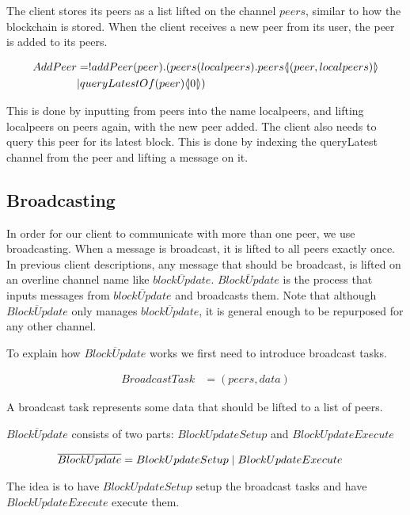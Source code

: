 The client stores its peers as a list lifted on the channel $peers$, similar to how the blockchain is stored.
When the client receives a new peer from its user, the peer is added to its peers.

\begin{align*}
    AddPeer &= !addPeer(peer).(peers(localpeers).peers \langle \! | (peer,localpeers) | \! \rangle\\
        &|queryLatestOf(peer) \langle \! | 0 | \! \rangle)\\
\end{align*}

This is done by inputting from peers into the name localpeers, and lifting localpeers on peers again, with the new peer added.
The client also needs to query this peer for its latest block.
This is done by indexing the queryLatest channel from the peer and lifting a message on it.

\subsection{Broadcasting}
In order for our client to communicate with more than one peer, we use broadcasting.
When a message is broadcast, it is lifted to all peers exactly once.
In previous client descriptions, any message that should be broadcast, is lifted on an overline channel name like $\overline{blockUpdate}$.
$\overline{BlockUpdate}$ is the process that inputs messages from $\overline{blockUpdate}$ and broadcasts them.
Note that although $\overline{BlockUpdate}$ only manages $\overline{blockUpdate}$, it is general enough to be repurposed for any other channel.

To explain how $\overline{BlockUpdate}$ works we first need to introduce broadcast tasks.

\begin{align*}
	BroadcastTask &= (peers, data)
\end{align*}

A broadcast task represents some data that should be lifted to a list of peers.

$\overline{BlockUpdate}$ consists of two parts: $BlockUpdateSetup$ and $BlockUpdateExecute$

\begin{align*}
    \overline{BlockUpdate} &= BlockUpdateSetup \mid BlockUpdateExecute
\end{align*}

The idea is to have $BlockUpdateSetup$ setup the broadcast tasks and have $BlockUpdateExecute$ execute them.

